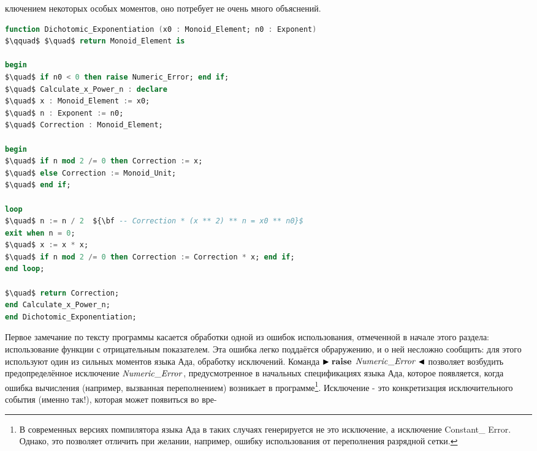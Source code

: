 
\noindent ключением некоторых особых моментов, оно потребует не очень много объяснений.
\begin{lstlisting}[mathescape=true, language=Ada, basicstyle=\small]
function Dichotomic_Exponentiation (x0 : Monoid_Element; n0 : Exponent)
$\qquad$ $\quad$ return Monoid_Element is

begin
$\quad$ if n0 < 0 then raise Numeric_Error; end if;
$\quad$ Calculate_x_Power_n : declare
$\quad$ x : Monoid_Element := x0;
$\quad$ n : Exponent := n0;
$\quad$ Correction : Monoid_Element;

begin
$\quad$ if n mod 2 /= 0 then Correction := x;
$\quad$ else Correction := Monoid_Unit;
$\quad$ end if;

loop
$\quad$ n := n / 2  ${\bf -- Correction * (x ** 2) ** n = x0 ** n0}$
exit when n = 0;
$\quad$ x := x * x;
$\quad$ if n mod 2 /= 0 then Correction := Correction * x; end if;
end loop;

$\quad$ return Correction;
end Calculate_x_Power_n;
end Dichotomic_Exponentiation;

\end{lstlisting}
 
 \par Первое замечание по тексту программы касается обработки одной из ошибок использования, отмеченной в начале этого раздела: использование функции с отрицательным показателем. Эта ошибка легко поддаётся обраружению, и о ней несложно сообщить: для этого используют один из сильных моментов языка Ада, обработку исключений. Команда $\blacktriangleright {\bf raise}$ \linebreak ${\it Numeric\_Error} \blacktriangleleft$ позволяет возбудить предопределённое исключение \linebreak ${\it Numeric\_ Error}$, предусмотренное в начальных спецификациях языка Ада, которое появляется, когда ошибка вычисления (например, вызванная переполнением) возникает в программе\footnote{В современных версиях помпилятора языка Ада в таких случаях генерируется не это исключение, а исключение Constant\_ Error. Однако, это позволяет отличить при желании, например, ошибку использования от переполнения разрядной сетки.}. Исключение - это конкретизация исключительного события (именно так!), которая может появиться во вре- \linebreak
 \newpage
 

